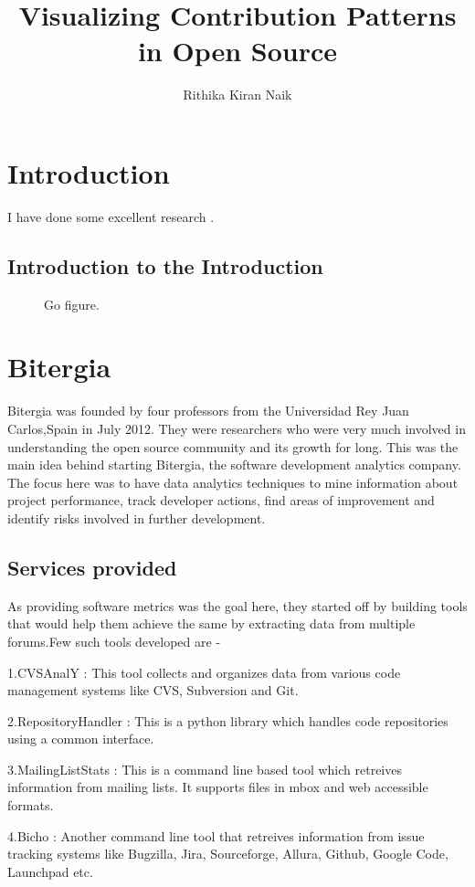 \documentclass[double,12pt]{beavtex}
\title{Visualizing Contribution Patterns in Open Source}
\author{Rithika Kiran Naik}
\begin{document}
\maketitle

\mainmatter

\chapter{Introduction}
I have done some excellent research \cite{matrix}.
\section{Introduction to the Introduction}
\begin{figure}[!ht]
\centering
{}
\caption{Go figure.}
\end{figure}

\chapter{Bitergia}
Bitergia was founded by four professors from the 	
Universidad Rey Juan Carlos,Spain in July 2012. They were researchers who were very much involved in understanding the open source community and its growth for long. This was the main idea behind starting Bitergia, the software development analytics company. The focus here was to have data analytics techniques to mine information about project performance, track developer actions, find areas of improvement and identify risks involved in further development. 
\section{Services provided}
As providing software metrics was the goal here, they started off by building tools that would help them achieve the same by extracting data from multiple forums.Few such tools developed are - 

1.CVSAnalY : This tool collects and organizes data from various code management systems like CVS, Subversion and Git.

2.RepositoryHandler : This is a python library which handles code repositories using a common interface.

3.MailingListStats : This is a command line based tool which retreives information from mailing lists. It supports files in mbox and web accessible formats.

4.Bicho : Another command line tool that retreives information from issue tracking systems like Bugzilla, Jira, Sourceforge, Allura, Github, Google Code, Launchpad etc.
\end{document}
